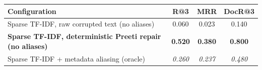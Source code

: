 \begin{tabular}{p{4.6cm}ccc}
\toprule
\textbf{Configuration} & \textbf{R@3} & \textbf{MRR} & \textbf{DocR@3} \\
\midrule
Sparse TF-IDF, raw corrupted text (no aliases) & 0.060 & 0.023 & 0.140 \\
\textbf{Sparse TF-IDF, deterministic Preeti repair (no aliases)} & \textbf{0.520} & \textbf{0.380} & \textbf{0.800} \\
Sparse TF-IDF + metadata aliasing (oracle) & \textit{0.260} & \textit{0.237} & \textit{0.480} \\
\bottomrule
\end{tabular}
